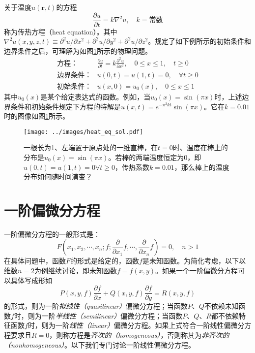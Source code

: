 \documentclass[main.tex]{subfiles}
\begin{document}
\begin{example}[传热方程]
    关于温度$u\left(\mathbf{r},t\right)$的方程
    \[
        \frac{\partial u}{\partial t}=k\nabla^2u,\quad k=\text{常数}
    \]
    称为传热方程（heat equation）。其中$\nabla^2 u\left(x,y,z,t\right)\equiv\partial^2 u/\partial x^2+\partial^2 u/\partial y^2+\partial^2 u/\partial z^2$。规定了如下例所示的初始条件和边界条件之后，可理解为如图\ref{fig:heat_eq_sol}所示的物理问题。
    \begin{align*}
        \text{方程：}   & \frac{\partial u}{\partial t}=k\frac{\partial^2 u}{\partial x^2},\quad 0\leq x\leq 1,\quad t\geq 0 \\
        \text{边界条件：} & u\left(0,t\right)=u\left(1,t\right)=0,\quad\forall t\geq 0                                         \\
        \text{初始条件：} & u\left(x,0\right)=u_0\left(x\right),\quad 0\leq x\leq 1
    \end{align*}
    其中$u_0\left(x\right)$是某个给定表达式的函数。例如，当$u_0\left(x\right)=\sin\left(\pi x\right)$时，上述边界条件和初始条件规定下方程的特解是$u\left(x,t\right)=e^{-\pi^2kt}\sin\left(\pi x\right)$。它在$k=0.01$时的图像如图\ref{fig:heat_eq_sol}所示。
\end{example}

\begin{figure}[ht]
    \centering
    \texttt{[image: ../images/heat\_eq\_sol.pdf]}
    \caption{一根长为1、左端置于原点处的一维直棒，在$t=0$时、温度在棒上的分布是$u_0\left(x\right)=\sin\left(\pi x\right)$。若棒的两端温度恒定为0，即$u\left(0,t\right)=u\left(1,t\right)=0\forall t\geq 0$，传热系数$k=0.01$，那么棒上的温度分布如何随时间演变？}
    \label{fig:heat_eq_sol}
\end{figure}

\section{一阶偏微分方程}
一阶偏微分方程的一般形式是：
\[
    F\left(x_1,x_2,\cdots,x_n;f;\frac{\partial}{\partial x_1}f,\cdots,\frac{\partial}{\partial x_n}f\right)=0,\quad n>1
\]
在具体问题中，函数$F$的形式是给定的，函数$f$是未知函数。为简化考虑，以下以维数$n=2$为例继续讨论，即未知函数$f=f\left(x,y\right)$。如果一个一阶偏微分方程可以具体写成形如
\begin{equation}\label{eq:linear_PDE}
    P\left(x,y,f\right)\frac{\partial f}{\partial x}+Q\left(x,y,f\right)\frac{\partial f}{\partial y}=R\left(x,y,f\right)
\end{equation}
的形式，则为一阶\emph{拟线性（quasilinear）}偏微分方程；当函数$P$、$Q$不依赖未知函数$f$时，则为一阶\emph{半线性（semilinear）}偏微分方程；当函数$P$、$Q$、$R$都不依赖特征函数$f$时，则为一阶\emph{线性（linear）}偏微分方程。如果上式符合一阶线性偏微分方程要求且$R=0$，则称方程是\emph{齐次的（homogeneous）}，否则称其为\emph{非齐次的（nonhomogeneous）}。以下我们专门讨论一阶线性偏微分方程。
\end{document}
